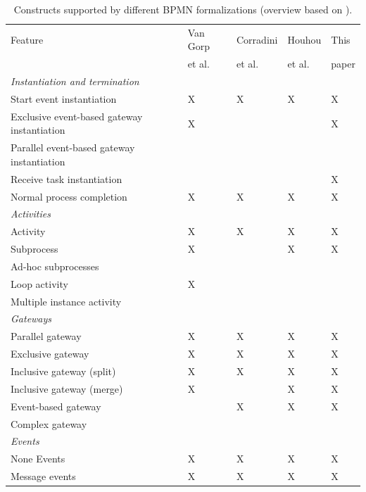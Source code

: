 \documentclass[submission, copyright, creativecommons]{eptcs}
\begin{document}
\begin{table}[htbp]
    \caption{Constructs supported by different BPMN formalizations (overview based on \cite{vangorpVisualTokenbasedFormalization2013}).}
    \label{tab:supportedconstructs}
    \begin{threeparttable}
    \begin{tabular}{l l l l l}
    \hline
      Feature & Van Gorp &  Corradini & Houhou & This\\
      & et al. \cite{vangorpVisualTokenbasedFormalization2013} & et al. \cite{corradiniFormalApproachAnalysis2021}& et al. \cite{houhouFirstOrderLogicVerification2022} & paper\\
      \hline
      \textit{Instantiation and termination} & &\\
      Start event instantiation & X & X & X & X\\
      Exclusive event-based gateway instantiation & X & & & X\\
      Parallel event-based gateway instantiation &  & & & \\
      Receive task instantiation & & & & X\\
      Normal process completion & X & X & X & X\\
      \textit{Activities} & & & &\\
      Activity & X & X & X & X\\
      Subprocess & X & & X & X\\
      Ad-hoc subprocesses & & & &\\
      Loop activity & X & & &\\
      Multiple instance activity & & & & \\
      \textit{Gateways} & & & &\\
      Parallel gateway & X & X & X & X\\
      Exclusive gateway & X & X & X & X\\
      Inclusive gateway (split) & X & X & X & X\\
      Inclusive gateway (merge) & X & & X & X\\
      Event-based gateway &  & X\tnote{1} & X & X\\ %
      Complex gateway & & & &\\
      \textit{Events} & & & & \\
      None Events & X & X & X & X\\
      Message events & X & X & X & X\\

\end{tabular}
\end{threeparttable}
\end{table}
\end{document}

